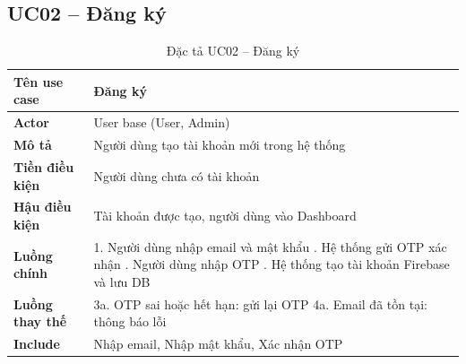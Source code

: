\subsection*{UC02 -- Đăng ký}
\begin{table}[H]
    \captionsetup{justification=raggedright, singlelinecheck=false}
    \caption{Đặc tả UC02 -- Đăng ký}
\centering
\begin{tabular}{|p{3.5cm}|p{10cm}|}
\hline
\textbf{Tên use case} & Đăng ký \\
\hline
\textbf{Actor} & User base (User, Admin) \\
\hline
\textbf{Mô tả} & Người dùng tạo tài khoản mới trong hệ thống \\
\hline
\textbf{Tiền điều kiện} & Người dùng chưa có tài khoản \\
\hline
\textbf{Hậu điều kiện} & Tài khoản được tạo, người dùng vào Dashboard \\
\hline
\textbf{Luồng chính} &
  1. Người dùng nhập email và mật khẩu \newline
  2. Hệ thống gửi OTP xác nhận \newline
  3. Người dùng nhập OTP \newline
  4. Hệ thống tạo tài khoản Firebase và lưu DB \\
\hline
\textbf{Luồng thay thế} &
  3a. OTP sai hoặc hết hạn: gửi lại OTP \newline
  4a. Email đã tồn tại: thông báo lỗi \\
\hline
\textbf{Include} & Nhập email, Nhập mật khẩu, Xác nhận OTP \\
\hline
\end{tabular}

\end{table}

